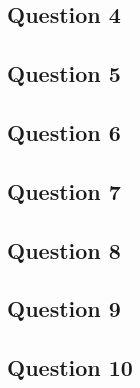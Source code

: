 \subsection{Question 4}
\subsection{Question 5}
\subsection{Question 6}
\subsection{Question 7}
\subsection{Question 8}
\subsection{Question 9}
\subsection{Question 10}
